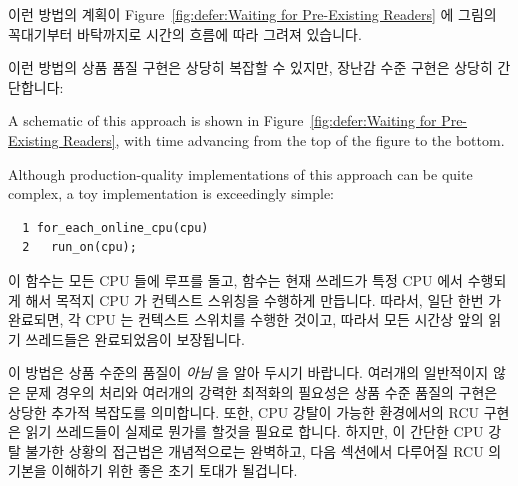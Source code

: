 이런 방법의 계획이
Figure~\ref{fig:defer:Waiting for Pre-Existing Readers} 에 그림의 꼭대기부터
바탁까지로 시간의 흐름에 따라 그려져 있습니다.

이런 방법의 상품 품질 구현은 상당히 복잡할 수 있지만, 장난감 수준 구현은 상당히
간단합니다:

A schematic of this approach is shown in
Figure~\ref{fig:defer:Waiting for Pre-Existing Readers},
with time advancing from the top of the figure to the bottom.

Although production-quality implementations of this approach can be
quite complex, a toy implementation is exceedingly simple:

\vspace{5pt}
\begin{minipage}[t]{\columnwidth}
\scriptsize
\begin{verbatim}
  1 for_each_online_cpu(cpu)
  2   run_on(cpu);
\end{verbatim}
\end{minipage}
\vspace{5pt}

이  함수는 모든 CPU 들에 루프를 돌고, 
함수는 현재 쓰레드가 특정 CPU 에서 수행되게 해서 목적지 CPU 가 컨텍스트
스위칭을 수행하게 만듭니다.
따라서, 일단 한번  가 완료되면, 각 CPU 는 컨텍스트
스위치를 수행한 것이고, 따라서 모든 시간상 앞의 읽기 쓰레드들은 완료되었음이
보장됩니다.

이 방법은 상품 수준의 품질이 \emph{아님} 을 알아 두시기 바랍니다.
여러개의 일반적이지 않은 문제 경우의 처리와 여러개의 강력한 최적화의 필요성은
상품 수준 품질의 구현은 상당한 추가적 복잡도를 의미합니다.
또한, CPU 강탈이 가능한 환경에서의 RCU 구현은 읽기 쓰레드들이 실제로 뭔가를
할것을 필요로 합니다.
하지만, 이 간단한 CPU 강탈 불가한 상황의 접근법은 개념적으로는 완벽하고, 다음
섹션에서 다루어질 RCU 의 기본을 이해하기 위한 좋은 초기 토대가 될겁니다.


